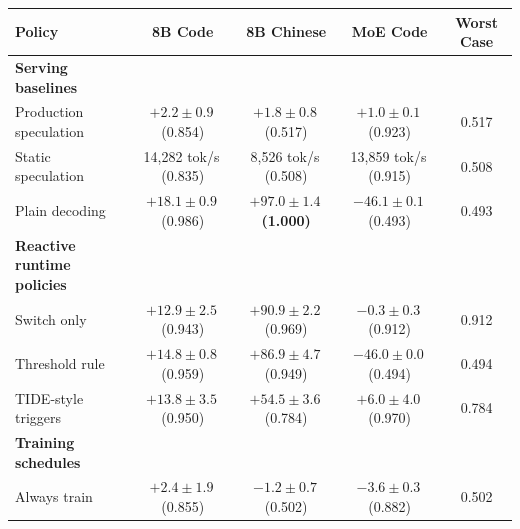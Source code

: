 
\renewcommand{\arraystretch}{1.15}
\setlength{\tabcolsep}{4pt}

\begin{tabular}{@{}lcccc@{}}
\toprule
\textbf{Policy} &
\textbf{8B Code} &
\textbf{8B Chinese} &
\textbf{MoE Code} &
\textbf{Worst Case} \\
\midrule

\rowcolor{tabGroup}
\textbf{\footnotesize Serving baselines}
& & & & \\

Production speculation
& $+2.2\pm0.9$\,{\scriptsize(0.854)}
& $+1.8\pm0.8$\,{\scriptsize(0.517)}
& $+1.0\pm0.1$\,{\scriptsize(0.923)}
& 0.517 \\

Static speculation
& 14{,}282 tok/s\,{\scriptsize(0.835)}
& 8{,}526 tok/s\,{\scriptsize(0.508)}
& 13{,}859 tok/s\,{\scriptsize(0.915)}
& 0.508 \\

Plain decoding
& $+18.1\pm0.9$\,{\scriptsize(0.986)}
& \cellcolor{tabBest}
  $\boldsymbol{+97.0\pm1.4}$\,{\scriptsize\bfseries(1.000)}
& $-46.1\pm0.1$\,{\scriptsize(0.493)}
& 0.493 \\

\addlinespace[3pt]

\rowcolor{tabGroup}
\textbf{\footnotesize Reactive runtime policies}
& & & & \\

Switch only
& $+12.9\pm2.5$\,{\scriptsize(0.943)}
& $+90.9\pm2.2$\,{\scriptsize(0.969)}
& $-0.3\pm0.3$\,{\scriptsize(0.912)}
& 0.912 \\

Threshold rule
& $+14.8\pm0.8$\,{\scriptsize(0.959)}
& $+86.9\pm4.7$\,{\scriptsize(0.949)}
& $-46.0\pm0.0$\,{\scriptsize(0.494)}
& 0.494 \\

TIDE-style triggers
& $+13.8\pm3.5$\,{\scriptsize(0.950)}
& $+54.5\pm3.6$\,{\scriptsize(0.784)}
& $+6.0\pm4.0$\,{\scriptsize(0.970)}
& 0.784 \\

\addlinespace[3pt]

\rowcolor{tabGroup}
\textbf{\footnotesize Training schedules}
& & & & \\

Always train
& $+2.4\pm1.9$\,{\scriptsize(0.855)}
& $-1.2\pm0.7$\,{\scriptsize(0.502)}
& $-3.6\pm0.3$\,{\scriptsize(0.882)}
& 0.502 \\


\end{tabular}
